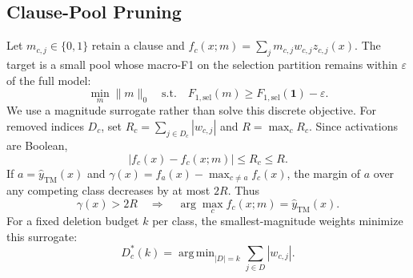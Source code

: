 \documentclass[conference]{IEEEtran}
\begin{document}
\subsection{Clause-Pool Pruning}
\label{sec:prune}
Let $m_{c,j}\in\{0,1\}$ retain a clause and
$f_c(x;m)=\sum_j m_{c,j}w_{c,j}z_{c,j}(x)$. The target is a small
pool whose macro-F1 on the selection partition remains within
$\varepsilon$ of the full model:
\begin{equation}
 \min_m\|m\|_0\quad\text{s.t.}\quad
 F_{1,\mathrm{sel}}(m)\ge F_{1,\mathrm{sel}}(\mathbf1)-\varepsilon.
 \label{eq:prune}
\end{equation}
We use a magnitude surrogate rather than solve this discrete objective.
For removed indices $D_c$, set
$R_c=\sum_{j\in D_c}|w_{c,j}|$ and $R=\max_cR_c$.
Since activations are Boolean,
\begin{equation}
 |f_c(x)-f_c(x;m)|\le R_c\le R.
 \label{eq:perturb}
\end{equation}
If $a=\hat y_{\mathrm{TM}}(x)$ and
$\gamma(x)=f_a(x)-\max_{c\ne a}f_c(x)$, the margin of $a$ over any
competing class decreases by at most $2R$. Thus
\begin{equation}
 \gamma(x)>2R\quad\Longrightarrow\quad
 \arg\max_c f_c(x;m)=\hat y_{\mathrm{TM}}(x).
 \label{eq:margin}
\end{equation}
For a fixed deletion budget $k$ per class, the smallest-magnitude
weights minimize this surrogate:
\begin{equation}
 D_c^*(k)=\operatorname{arg\,min}_{|D|=k}
                   \sum_{j\in D}|w_{c,j}|.
 \label{eq:greedy}
\end{equation}
\end{document}
